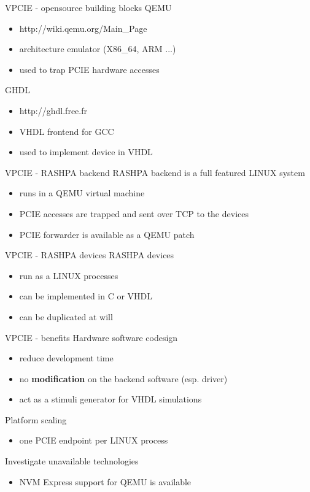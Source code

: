 \documentclass{beamer}
\begin{document}
\begin{frame}{VPCIE - opensource building blocks}
  QEMU 
  \begin{itemize}
  \item http://wiki.qemu.org/Main\_Page
  \item architecture emulator (X86\_64, ARM ...)
  \item used to trap PCIE hardware accesses
  \end{itemize}
  GHDL
  \begin{itemize}
  \item http://ghdl.free.fr
  \item VHDL frontend for GCC
  \item used to implement device in VHDL
  \end{itemize}
\end{frame}

\begin{frame}{VPCIE - RASHPA backend}
  RASHPA backend is a full featured LINUX system
  \begin{itemize}
  \item runs in a QEMU virtual machine
  \item PCIE accesses are trapped and sent over TCP to the devices
  \item PCIE forwarder is available as a QEMU patch
  \end{itemize}
\end{frame}

\begin{frame}{VPCIE - RASHPA devices}
  RASHPA devices
  \begin{itemize}
  \item run as a LINUX processes
  \item can be implemented in C or VHDL
  \item can be duplicated at will
  \end{itemize}
\end{frame}

\begin{frame}{VPCIE - benefits}
  Hardware software codesign
  \begin{itemize}
  \item reduce development time
  \item no \textbf{modification} on the backend software (esp. driver)
  \item act as a stimuli generator for VHDL simulations
  \end{itemize}

  Platform scaling
  \begin{itemize}
  \item one PCIE endpoint per LINUX process
  \end{itemize}

  Investigate unavailable technologies
  \begin{itemize}
  \item NVM Express support for QEMU is available
  \end{itemize}
\end{frame}
\end{document}
